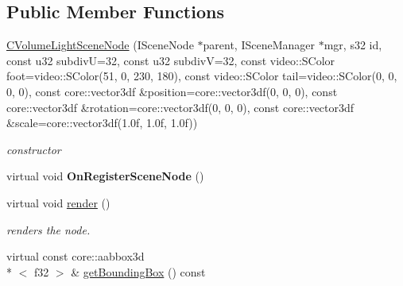 \subsection*{Public Member Functions}
\begin{DoxyCompactItemize}
\item 
\hypertarget{classirr_1_1scene_1_1_c_volume_light_scene_node_a19d58f3ab2b5d6d13ef1dba7a8d1d4db}{\hyperlink{classirr_1_1scene_1_1_c_volume_light_scene_node_a19d58f3ab2b5d6d13ef1dba7a8d1d4db}{C\-Volume\-Light\-Scene\-Node} (I\-Scene\-Node $\ast$parent, I\-Scene\-Manager $\ast$mgr, s32 id, const u32 subdiv\-U=32, const u32 subdiv\-V=32, const video\-::\-S\-Color foot=video\-::\-S\-Color(51, 0, 230, 180), const video\-::\-S\-Color tail=video\-::\-S\-Color(0, 0, 0, 0), const core\-::vector3df \&position=core\-::vector3df(0, 0, 0), const core\-::vector3df \&rotation=core\-::vector3df(0, 0, 0), const core\-::vector3df \&scale=core\-::vector3df(1.\-0f, 1.\-0f, 1.\-0f))}\label{classirr_1_1scene_1_1_c_volume_light_scene_node_a19d58f3ab2b5d6d13ef1dba7a8d1d4db}

\begin{DoxyCompactList}\small\item\em constructor \end{DoxyCompactList}\item 
\hypertarget{classirr_1_1scene_1_1_c_volume_light_scene_node_a488be2ff4e5aa6133b5f9fa5bd407eec}{virtual void {\bfseries On\-Register\-Scene\-Node} ()}\label{classirr_1_1scene_1_1_c_volume_light_scene_node_a488be2ff4e5aa6133b5f9fa5bd407eec}

\item 
\hypertarget{classirr_1_1scene_1_1_c_volume_light_scene_node_a2b584321a653063fec37f2276ef15230}{virtual void \hyperlink{classirr_1_1scene_1_1_c_volume_light_scene_node_a2b584321a653063fec37f2276ef15230}{render} ()}\label{classirr_1_1scene_1_1_c_volume_light_scene_node_a2b584321a653063fec37f2276ef15230}

\begin{DoxyCompactList}\small\item\em renders the node. \end{DoxyCompactList}\item 
\hypertarget{classirr_1_1scene_1_1_c_volume_light_scene_node_af06c6b4143179543e1fb4bfa9fd1c25f}{virtual const core\-::aabbox3d\\*
$<$ f32 $>$ \& \hyperlink{classirr_1_1scene_1_1_c_volume_light_scene_node_af06c6b4143179543e1fb4bfa9fd1c25f}{get\-Bounding\-Box} () const }\label{classirr_1_1scene_1_1_c_volume_light_scene_node_af06c6b4143179543e1fb4bfa9fd1c25f}


\end{DoxyCompactItemize}
